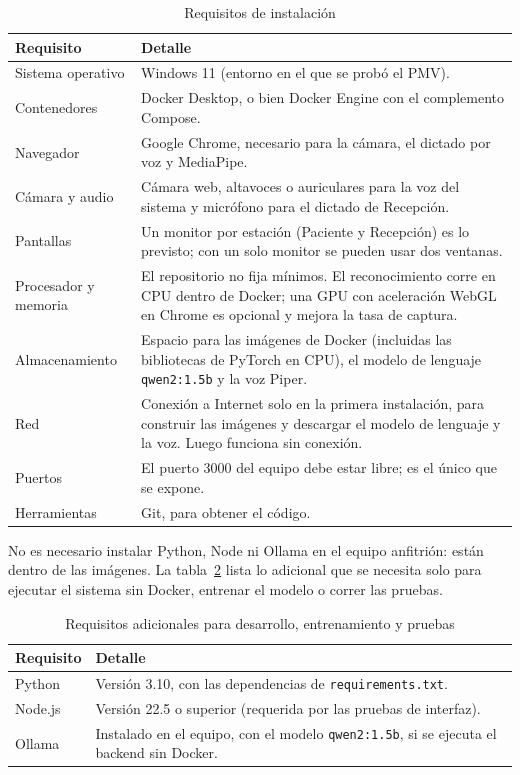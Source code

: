 \begin{table}[H]
  \centering
  \caption{Requisitos de instalación}\label{tab:req-instalacion}
  \small
  \begin{tabularx}{\textwidth}{>{\raggedright\arraybackslash}p{3.6cm} X}
    \toprule
    \textbf{Requisito} & \textbf{Detalle} \\
    \midrule
    Sistema operativo & Windows 11 (entorno en el que se probó el PMV). \\
    Contenedores & Docker Desktop, o bien Docker Engine con el complemento Compose. \\
    Navegador & Google Chrome, necesario para la cámara, el dictado por voz y MediaPipe. \\
    Cámara y audio & Cámara web, altavoces o auriculares para la voz del sistema y micrófono para el dictado de Recepción. \\
    Pantallas & Un monitor por estación (Paciente y Recepción) es lo previsto; con un solo monitor se pueden usar dos ventanas. \\
    Procesador y memoria & El repositorio no fija mínimos. El reconocimiento corre en CPU dentro de Docker; una GPU con aceleración WebGL en Chrome es opcional y mejora la tasa de captura. \\
    Almacenamiento & Espacio para las imágenes de Docker (incluidas las bibliotecas de PyTorch en CPU), el modelo de lenguaje \texttt{qwen2:1.5b} y la voz Piper. \\
    Red & Conexión a Internet solo en la primera instalación, para construir las imágenes y descargar el modelo de lenguaje y la voz. Luego funciona sin conexión. \\
    Puertos & El puerto 3000 del equipo debe estar libre; es el único que se expone. \\
    Herramientas & Git, para obtener el código. \\
    \bottomrule
  \end{tabularx}
\end{table}

No es necesario instalar Python, Node ni Ollama en el equipo anfitrión: están dentro de las imágenes. La tabla~\ref{tab:req-desarrollo} lista lo adicional que se necesita solo para ejecutar el sistema sin Docker, entrenar el modelo o correr las pruebas.

\begin{table}[H]
  \centering
  \caption{Requisitos adicionales para desarrollo, entrenamiento y pruebas}\label{tab:req-desarrollo}
  \small
  \begin{tabularx}{\textwidth}{>{\raggedright\arraybackslash}p{3.6cm} X}
    \toprule
    \textbf{Requisito} & \textbf{Detalle} \\
    \midrule
    Python & Versión 3.10, con las dependencias de \texttt{requirements.txt}. \\
    Node.js & Versión 22.5 o superior (requerida por las pruebas de interfaz). \\
    Ollama & Instalado en el equipo, con el modelo \texttt{qwen2:1.5b}, si se ejecuta el backend sin Docker. \\
    \bottomrule
  \end{tabularx}
\end{table}

